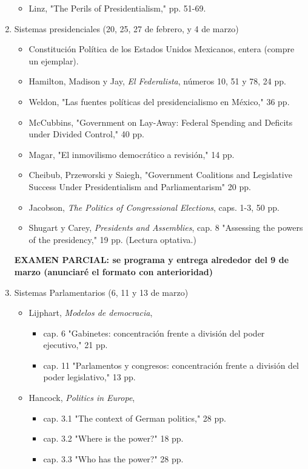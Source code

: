 \documentclass{article}
\begin{document}
\begin{enumerate}
\begin{itemize}
\item Linz, "The Perils of Presidentialism," pp. 51-69.
\end{itemize}
\item Sistemas presidenciales  (20, 25, 27 de febrero, y 4 de marzo)
\label{sec:org94aa842}
\begin{itemize}
\item Constitución Política de los Estados Unidos Mexicanos, entera (compre un ejemplar).
\item Hamilton, Madison y Jay, \emph{El Federalista}, números 10, 51 y 78, 24 pp.
\item Weldon, "Las fuentes políticas del presidencialismo en México," 36 pp.
\item McCubbins, "Government on Lay-Away: Federal Spending and Deficits under Divided Control," 40 pp.
\item Magar, "El inmovilismo democrático a revisión," 14 pp.
\item Cheibub, Przeworski y Saiegh, "Government Coalitions and Legislative Success Under Presidentialism and Parliamentarism" 20 pp.
\item Jacobson, \emph{The Politics of Congressional Elections}, caps. 1-3, 50 pp.
\item Shugart y Carey, \emph{Presidents and Assemblies}, cap. 8 "Assessing the powers of the presidency," 19 pp.   (Lectura optativa.)
\end{itemize}
\textbf{EXAMEN PARCIAL: se programa y entrega alrededor del 9 de marzo (anunciaré el formato con anterioridad)}
\item Sistemas Parlamentarios  (6, 11 y 13 de marzo)
\label{sec:org628cca9}
\begin{itemize}
\item Lijphart, \emph{Modelos de democracia}, 
\begin{itemize}
\item cap. 6 "Gabinetes: concentración frente a división del poder ejecutivo," 21 pp.
\item cap. 11 "Parlamentos y congresos: concentración frente a división del poder legislativo," 13 pp.
\end{itemize}
\item Hancock, \emph{Politics in Europe}, 
\begin{itemize}
\item cap. 3.1 "The context of German politics," 28 pp.
\item cap. 3.2 "Where is the power?" 18 pp.
\item cap. 3.3 "Who has the power?" 28 pp.

\end{itemize}
\end{itemize}
\end{enumerate}
\end{document}
